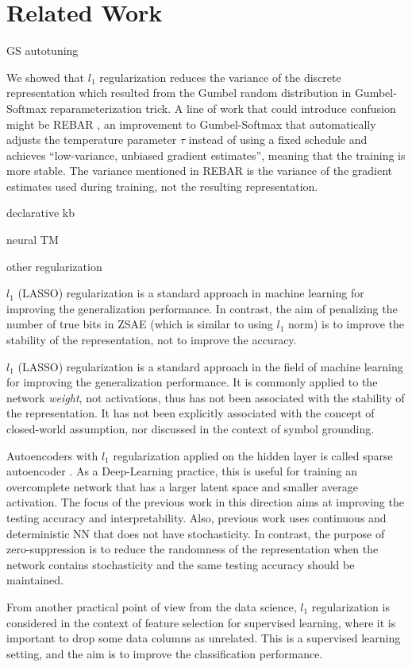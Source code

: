 \section{Related Work}

GS autotuning

We showed that $l_1$ regularization reduces the variance of the discrete
representation which resulted from the Gumbel random distribution
in Gumbel-Softmax reparameterization
trick.  A line of work that could introduce confusion might be REBAR
\cite{TuckerMMLS17}, an improvement to Gumbel-Softmax that automatically
adjusts the temperature parameter $\tau$ instead of using a fixed
schedule and achieves ``low-variance, unbiased gradient estimates'',
meaning that the training is more stable. The variance mentioned in
REBAR is the variance of the gradient estimates used during training, not the
resulting representation.

declarative kb

neural TM

other regularization

$l_1$ (LASSO) regularization is a standard approach in 
machine learning for improving the generalization performance.
In contrast, the aim of penalizing the number of true bits in ZSAE
 (which is similar to using $l_1$ norm)
is to improve the stability of the representation, not to improve the accuracy.

$l_1$ (LASSO) regularization is a standard approach in the field of machine learning for improving the
generalization performance.
It is commonly applied to the network \emph{weight}, not activations,
thus has not been associated with the stability of the representation.
It has not been explicitly associated with the concept of
closed-world assumption, nor discussed in the context of symbol grounding.

Autoencoders with $l_1$ regularization applied on the hidden layer
is called sparse autoencoder \cite{ng2011cs294a}.
As a Deep-Learning practice,
this is useful for training an overcomplete network that has a larger latent space and smaller average activation.
The focus of the previous work in this direction aims at improving the testing accuracy and interpretability.
Also, previous work uses continuous and deterministic NN that does not have stochasticity.
In contrast, the purpose of zero-suppression is to reduce the randomness of the representation
when the network contains stochasticity and the same testing accuracy should be maintained.

From another practical point of view from the data science,
$l_1$ regularization is considered in the context of feature selection for supervised learning,
where it is important to drop some data columns as unrelated.
This is a supervised learning setting, and the aim is to improve the classification performance.

